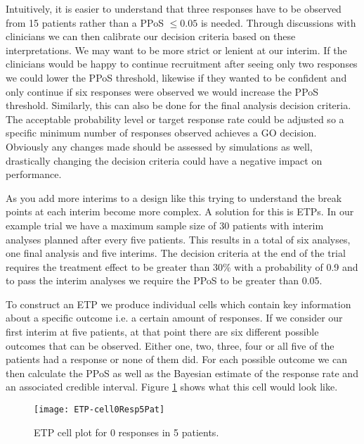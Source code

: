 Intuitively, it is easier to understand that three responses have to be observed from 15 patients rather than a PPoS $\leq 0.05$ is needed. Through discussions with clinicians we can then calibrate our decision criteria based on these interpretations. We may want to be more strict or lenient at our interim. If the clinicians would be happy to continue recruitment after seeing only two responses we could lower the PPoS threshold, likewise if they wanted to be confident and only continue if six responses were observed we would increase the PPoS threshold. Similarly, this can also be done for the final analysis decision criteria. The acceptable probability level or target response rate could be adjusted so a specific minimum number of responses observed achieves a GO decision. Obviously any changes made should be assessed by simulations as well, drastically changing the decision criteria could have a negative impact on performance. 
 
As you add more interims to a design like this trying to understand the break points at each interim become more complex. A solution for this is ETPs. In our example trial we have a maximum sample size of 30 patients with interim analyses planned after every five patients. This results in a total of six analyses, one final analysis and five interims. The decision criteria at the end of the trial requires the treatment effect to be greater than 30\% with a probability of 0.9 and to pass the interim analyses we require the PPoS to be greater than 0.05. 

To construct an ETP we produce individual cells which contain key information about a specific outcome i.e. a certain amount of responses. If we consider our first interim at five patients, at that point there are six different possible outcomes that can be observed. Either one, two, three, four or all five of the patients had a response or none of them did. For each possible outcome we can then calculate the PPoS as well as the Bayesian estimate of the response rate and an associated credible interval. Figure \ref{fig_etp:Cell0Resp5Pat} shows what this cell would look like. 

\begin{figure}[h!]
	\centering
	\caption{ETP cell plot for 0 responses in 5 patients.}
	\label{fig_etp:Cell0Resp5Pat}
	\texttt{[image: ETP-cell0Resp5Pat]}
\end{figure}

